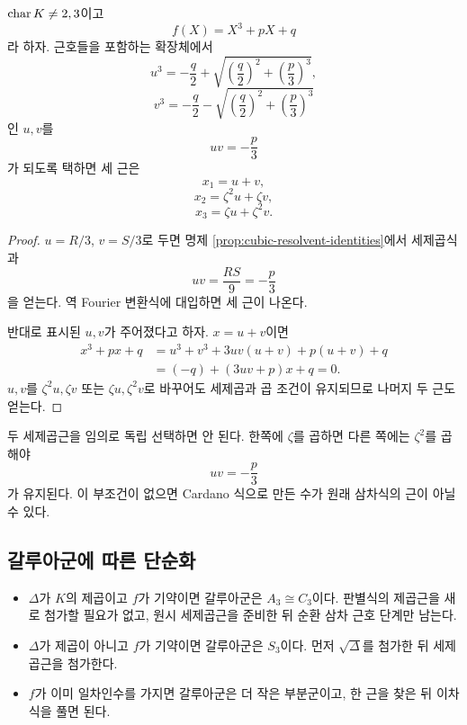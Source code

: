 \begin{theorem}[Cardano 공식]
\label{thm:cardano-formula}
$\operatorname{char} K\ne2,3$이고
\[
  f(X)=X^3+pX+q
\]
라 하자. 근호들을 포함하는 확장체에서
\[
  u^3=-\frac q2+\sqrt{
  \left(\frac q2\right)^2+\left(\frac p3\right)^3},
\]
\[
  v^3=-\frac q2-\sqrt{
  \left(\frac q2\right)^2+\left(\frac p3\right)^3}
\]
인 $u,v$를
\[
  uv=-\frac p3
\]
가 되도록 택하면 세 근은
\[
  \boxed{x_1=u+v},
\]
\[
  \boxed{x_2=\zeta^2u+\zeta v},
\]
\[
  \boxed{x_3=\zeta u+\zeta^2v}.
\]
\end{theorem}

\begin{proof}
$u=R/3$, $v=S/3$로 두면 명제 \ref{prop:cubic-resolvent-identities}에서 세제곱식과
\[
  uv=\frac{RS}{9}=-\frac p3
\]
을 얻는다. 역 Fourier 변환식에 대입하면 세 근이 나온다.

반대로 표시된 $u,v$가 주어졌다고 하자. $x=u+v$이면
\[
\begin{aligned}
x^3+px+q
&=u^3+v^3+3uv(u+v)+p(u+v)+q\\
&=(-q)+(3uv+p)x+q=0.
\end{aligned}
\]
$u,v$를 $\zeta^2u,\zeta v$ 또는 $\zeta u,\zeta^2v$로 바꾸어도 세제곱과 곱 조건이 유지되므로 나머지 두 근도 얻는다.
\end{proof}

\begin{pitfall}[세제곱근의 독립 선택]
두 세제곱근을 임의로 독립 선택하면 안 된다. 한쪽에 $\zeta$를 곱하면 다른 쪽에는 $\zeta^2$를 곱해야
\[
  uv=-\frac p3
\]
가 유지된다. 이 부조건이 없으면 Cardano 식으로 만든 수가 원래 삼차식의 근이 아닐 수 있다.
\end{pitfall}

\subsection{갈루아군에 따른 단순화}

\begin{itemize}
  \item $\Delta$가 $K$의 제곱이고 $f$가 기약이면 갈루아군은 $A_3\cong C_3$이다. 판별식의 제곱근을 새로 첨가할 필요가 없고, 원시 세제곱근을 준비한 뒤 순환 삼차 근호 단계만 남는다.
  \item $\Delta$가 제곱이 아니고 $f$가 기약이면 갈루아군은 $S_3$이다. 먼저 $\sqrt\Delta$를 첨가한 뒤 세제곱근을 첨가한다.
  \item $f$가 이미 일차인수를 가지면 갈루아군은 더 작은 부분군이고, 한 근을 찾은 뒤 이차식을 풀면 된다.
\end{itemize}

